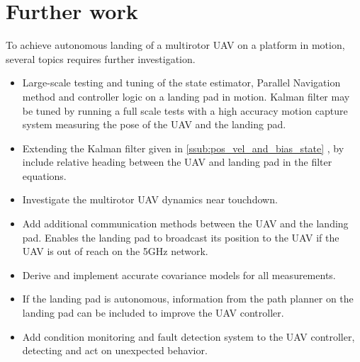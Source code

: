 \section*{Further work} %
\label{sec:further_work}
To achieve autonomous landing of a multirotor \gls{UAV} on a platform in motion, several topics requires further investigation.
\begin{itemize}
	\item Large-scale testing and tuning of the state estimator, Parallel Navigation method and controller logic on a landing pad in motion. Kalman filter may be tuned by running a full scale tests with a high accuracy motion capture system measuring the pose of the \gls{UAV} and the landing pad.
	\item Extending the Kalman filter given in \ref{ssub:pos_vel_and_bias_state} , by include relative heading between the \gls{UAV} and landing pad in the filter equations.
	\item Investigate the multirotor \gls{UAV} dynamics near touchdown.
	\item Add additional communication methods between the \gls{UAV} and the landing pad. Enables the landing pad to broadcast its position to the \gls{UAV} if the \gls{UAV} is out of reach on the 5GHz network.
	\item Derive and implement accurate covariance models for all measurements. 
	\item If the landing pad is autonomous, information from the path planner on the landing pad can be included to improve the \gls{UAV} controller.
	\item Add condition monitoring and fault detection system to the \gls{UAV} controller, detecting and act on unexpected behavior.
\end{itemize}

